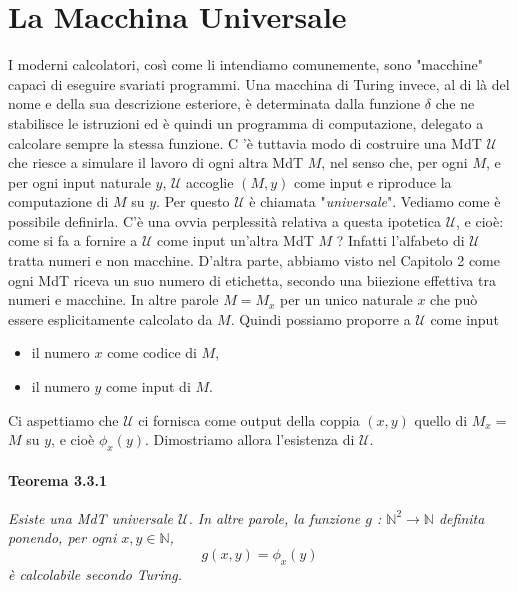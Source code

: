 \section{La Macchina Universale}

I moderni calcolatori, così come li intendiamo comunemente, sono "macchine" capaci di
eseguire svariati programmi. Una macchina di Turing invece, al di là del nome e della
sua descrizione esteriore, è determinata dalla funzione $\delta$ che ne stabilisce le
istruzioni ed è quindi un programma di computazione, delegato a calcolare sempre la
stessa funzione. $\mathrm{C}$ 'è tuttavia modo di costruire una MdT $\mathcal{U}$ che
riesce a simulare il lavoro di ogni altra MdT $M$, nel senso che, per ogni $M$, e per
ogni input naturale $y$, $\mathcal{U}$ accoglie $(M, y)$ come input e riproduce la
computazione di $M$ su $y$. Per questo $\mathcal{U}$ è chiamata
"\textit{universale}". Vediamo come è possibile definirla. C'è una ovvia perplessità
relativa a questa ipotetica $\mathcal{U}$, e cioè: come si fa a fornire a $\mathcal{U}$
come input un'altra MdT $M$ ? Infatti l'alfabeto di $\mathcal{U}$ tratta numeri e non
macchine. D'altra parte, abbiamo visto nel Capitolo 2 come ogni MdT riceva un suo
numero di etichetta, secondo una biiezione effettiva tra numeri e macchine. In altre
parole $M=M_x$ per un unico naturale $x$ che può essere esplicitamente calcolato da
$M$. Quindi possiamo proporre a $\mathcal{U}$ come input

\begin{itemize}
    \item il numero $x$ come codice di $M$,
    \item il numero $y$ come input di $M$.
\end{itemize}

Ci aspettiamo che $\mathcal{U}$ ci fornisca come
output della coppia $(x, y)$ quello di $M_x=$ $M$ su $y$, e cioè $\phi_x(y)$.
Dimostriamo allora l'esistenza di $\mathcal{U}$.

\paragraph{Teorema 3.3.1} \textit{Esiste una MdT universale $\mathcal{U}$. In altre parole, la funzione $g$ :
    $\mathbb{N}^2 \rightarrow \mathbb{N}$ definita ponendo, per ogni $x, y \in
        \mathbb{N}$,
    $$
        g(x, y)=\phi_x(y)
    $$
    è calcolabile secondo Turing. }\\

